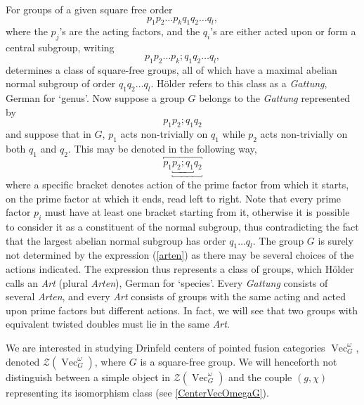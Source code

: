 \documentclass[11pt]{book}
\theoremstyle{Rem}
\theoremstyle{definition}
\numberwithin{equation}{section}
\newcommand\Vect{\operatorname{Vec}}
\newcommand\CTR{\mathcal Z}
\begin{document}
 For groups of a given square free order 
\begin{equation}\label{order}
	p_1p_2\dots p_kq_1q_2\dots q_l,\end{equation} 
  where the $p_j$'s are the acting factors, and the $q_i$'s are either acted upon or form a central subgroup, writing
 \begin{equation}
  	p_1p_2\dots p_k;q_1q_2\dots q_l,
  \end{equation} determines a class of square-free groups, all of which have a maximal abelian normal subgroup of order $q_1q_2\dots q_l$. H\"older refers to this class as a \textit{Gattung}, German for `genus'. 	 
  Now suppose a group $G$ belongs to the \textit{Gattung} represented by 
  \begin{equation}
  	p_1p_2;q_1q_2
  \end{equation}
and suppose that in $G$, $p_1$ acts non-trivially on $q_1$ while $p_2$ acts non-trivially on both $q_1$ and $q_2$. This may be denoted in the following way,
\begin{equation}\label{arten}
	\overbracket{p_1{\underbracket{\underbracket{p_2;q_1}q_2}}} 
\end{equation}
where a specific bracket denotes action of the prime factor from which it starts, on  the prime factor at which it ends, read left to right. Note that every prime factor $p_i$ must have at least one bracket starting from it, otherwise it is possible to consider it as a constituent of the normal subgroup, thus contradicting the fact that the largest abelian normal subgroup has order $q_1\dots q_l$. The group $G$ is surely not determined by the expression (\ref{arten}) as there may be several choices of the actions indicated. The expression thus represents a class of groups, which H\"older calls an \textit{Art} (plural \textit{Arten}), German for `species'. Every \textit{Gattung} consists of several \textit{Arten}, and every \textit{Art} consists of groups with the same acting and acted upon prime factors but different actions. In fact, we will see that two groups with equivalent twisted doubles must lie in the same \textit{Art}.

We are interested in studying Drinfeld centers of pointed fusion categories $\Vect^\omega_G$, denoted $\CTR(\Vect^{\omega}_{G})$, where $G$ is a square-free group. We will henceforth not distinguish between a simple object in $\CTR(\Vect^{\omega}_{G})$ and the couple $(g, \chi)$ representing its isomorphism class (see \ref{CenterVecOmegaG}).
\end{document}
